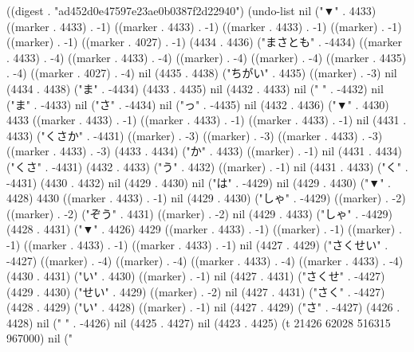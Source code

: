 
((digest . "ad452d0e47597e23ae0b0387f2d22940") (undo-list nil ("▼" . 4433) ((marker . 4433) . -1) ((marker . 4433) . -1) ((marker . 4433) . -1) ((marker) . -1) ((marker) . -1) ((marker . 4027) . -1) (4434 . 4436) ("まさとも" . -4434) ((marker . 4433) . -4) ((marker . 4433) . -4) ((marker) . -4) ((marker) . -4) ((marker . 4435) . -4) ((marker . 4027) . -4) nil (4435 . 4438) ("ちがい" . 4435) ((marker) . -3) nil (4434 . 4438) ("ま" . -4434) (4433 . 4435) nil (4432 . 4433) nil (" " . -4432) nil ("ま" . -4433) nil ("さ" . -4434) nil ("っ" . -4435) nil (4432 . 4436) ("▼" . 4430) 4433 ((marker . 4433) . -1) ((marker . 4433) . -1) ((marker . 4433) . -1) nil (4431 . 4433) ("くさか" . -4431) ((marker) . -3) ((marker) . -3) ((marker . 4433) . -3) ((marker . 4433) . -3) (4433 . 4434) ("か" . 4433) ((marker) . -1) nil (4431 . 4434) ("くさ" . -4431) (4432 . 4433) ("う" . 4432) ((marker) . -1) nil (4431 . 4433) ("く" . -4431) (4430 . 4432) nil (4429 . 4430) nil ("は" . -4429) nil (4429 . 4430) ("▼" . 4428) 4430 ((marker . 4433) . -1) nil (4429 . 4430) ("しゃ" . -4429) ((marker) . -2) ((marker) . -2) ("ぞう" . 4431) ((marker) . -2) nil (4429 . 4433) ("しゃ" . -4429) (4428 . 4431) ("▼" . 4426) 4429 ((marker . 4433) . -1) ((marker) . -1) ((marker) . -1) ((marker . 4433) . -1) ((marker . 4433) . -1) nil (4427 . 4429) ("さくせい" . -4427) ((marker) . -4) ((marker) . -4) ((marker . 4433) . -4) ((marker . 4433) . -4) (4430 . 4431) ("い" . 4430) ((marker) . -1) nil (4427 . 4431) ("さくせ" . -4427) (4429 . 4430) ("せい" . 4429) ((marker) . -2) nil (4427 . 4431) ("さく" . -4427) (4428 . 4429) ("い" . 4428) ((marker) . -1) nil (4427 . 4429) ("さ" . -4427) (4426 . 4428) nil (" " . -4426) nil (4425 . 4427) nil (4423 . 4425) (t 21426 62028 516315 967000) nil ("%
